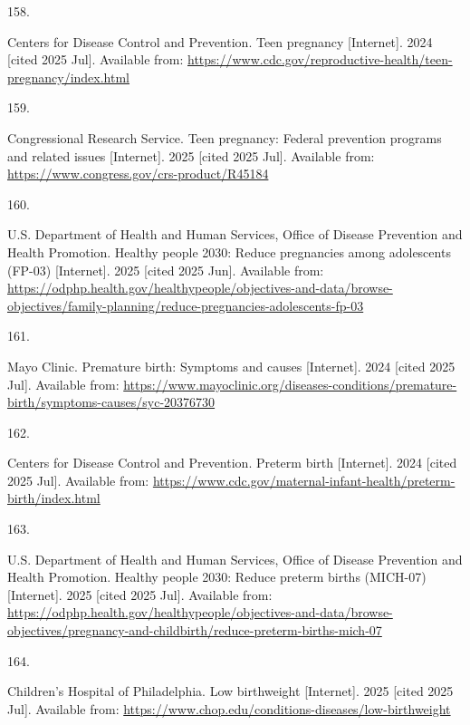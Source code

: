 \documentclass[
  english,
  letterpaper,
]{report}
\newlength{\cslhangindent}
\newlength{\csllabelwidth}
\newenvironment{CSLReferences}[2] %
 {\begin{list}{}{%
  \setlength{\itemindent}{0pt}
  \setlength{\leftmargin}{0pt}
  \setlength{\parsep}{0pt}
  \ifodd #1
   \setlength{\leftmargin}{\cslhangindent}
   \setlength{\itemindent}{-1\cslhangindent}
  \fi
  \setlength{\itemsep}{#2\baselineskip}}}
 {\end{list}}
\newcommand{\CSLLeftMargin}[1]{\parbox[t]{\csllabelwidth}{\strut#1\strut}}
\newcommand{\CSLRightInline}[1]{\parbox[t]{\linewidth - \csllabelwidth}{\strut#1\strut}}
\begin{document}
\begin{CSLReferences}{0}{1}
\CSLLeftMargin{158. }%
\CSLRightInline{Centers for Disease Control and Prevention. Teen
pregnancy {[}Internet{]}. 2024 {[}cited 2025 Jul{]}. Available from:
\url{https://www.cdc.gov/reproductive-health/teen-pregnancy/index.html}}

\CSLLeftMargin{159. }%
\CSLRightInline{Congressional Research Service. Teen pregnancy: Federal
prevention programs and related issues {[}Internet{]}. 2025 {[}cited
2025 Jul{]}. Available from:
\url{https://www.congress.gov/crs-product/R45184}}

\CSLLeftMargin{160. }%
\CSLRightInline{U.S. Department of Health and Human Services, Office of
Disease Prevention and Health Promotion. Healthy people 2030: Reduce
pregnancies among adolescents (FP-03) {[}Internet{]}. 2025 {[}cited 2025
Jun{]}. Available from:
\url{https://odphp.health.gov/healthypeople/objectives-and-data/browse-objectives/family-planning/reduce-pregnancies-adolescents-fp-03}}

\CSLLeftMargin{161. }%
\CSLRightInline{Mayo Clinic. Premature birth: Symptoms and causes
{[}Internet{]}. 2024 {[}cited 2025 Jul{]}. Available from:
\url{https://www.mayoclinic.org/diseases-conditions/premature-birth/symptoms-causes/syc-20376730}}

\CSLLeftMargin{162. }%
\CSLRightInline{Centers for Disease Control and Prevention. Preterm
birth {[}Internet{]}. 2024 {[}cited 2025 Jul{]}. Available from:
\url{https://www.cdc.gov/maternal-infant-health/preterm-birth/index.html}}

\CSLLeftMargin{163. }%
\CSLRightInline{U.S. Department of Health and Human Services, Office of
Disease Prevention and Health Promotion. Healthy people 2030: Reduce
preterm births (MICH-07) {[}Internet{]}. 2025 {[}cited 2025 Jul{]}.
Available from:
\url{https://odphp.health.gov/healthypeople/objectives-and-data/browse-objectives/pregnancy-and-childbirth/reduce-preterm-births-mich-07}}

\CSLLeftMargin{164. }%
\CSLRightInline{Children's Hospital of Philadelphia. Low birthweight
{[}Internet{]}. 2025 {[}cited 2025 Jul{]}. Available from:
\url{https://www.chop.edu/conditions-diseases/low-birthweight}}


\end{CSLReferences}
\end{document}
